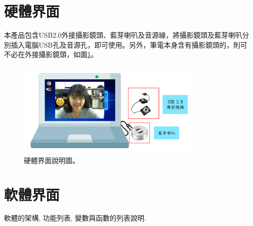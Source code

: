 \documentclass[12pt]{scrreprt}
\begin{document}
\section{硬體界面}
本產品包含USB2.0外接攝影鏡頭、藍芽喇叭及音源線，將攝影鏡頭及藍芽喇叭分別插入電腦USB孔及音源孔，即可使用。另外，筆電本身含有攝影鏡頭的，則可不必在外接攝影鏡頭，如圖\ref{fig:hardInterface}。
\begin{figure}[!h]
\begin{center}
\includegraphics[width=0.8\textwidth]{./figs/hardware.pdf}
\end{center}
\caption{硬體界面說明圖。}
\label{fig:hardInterface}
\end{figure}

\section{軟體界面}
軟體的架構, 功能列表, 變數與函數的列表說明.
\end{document}
